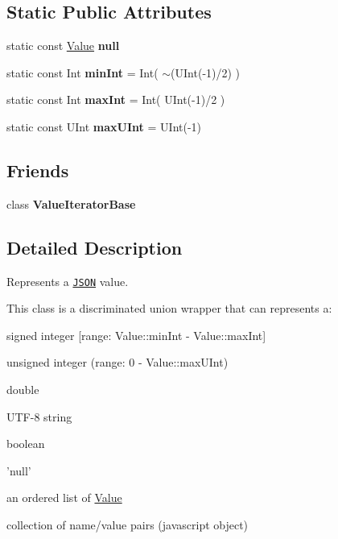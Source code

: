 \subsection*{Static Public Attributes}
\begin{DoxyCompactItemize}
\item 
\hypertarget{class_json_1_1_value_ae5c01c1a10d1e9fb731aae53e8234e24}{static const \hyperlink{class_json_1_1_value}{Value} {\bfseries null}}\label{class_json_1_1_value_ae5c01c1a10d1e9fb731aae53e8234e24}

\item 
\hypertarget{class_json_1_1_value_a2d95300265aecf56a1f051203656bd18}{static const Int {\bfseries min\+Int} = Int( $\sim$(U\+Int(-\/1)/2) )}\label{class_json_1_1_value_a2d95300265aecf56a1f051203656bd18}

\item 
\hypertarget{class_json_1_1_value_a8d0822b65b23b9cec6626195cf5343af}{static const Int {\bfseries max\+Int} = Int( U\+Int(-\/1)/2 )}\label{class_json_1_1_value_a8d0822b65b23b9cec6626195cf5343af}

\item 
\hypertarget{class_json_1_1_value_ae881a8e48d8e6d6ba87ede37e279f051}{static const U\+Int {\bfseries max\+U\+Int} = U\+Int(-\/1)}\label{class_json_1_1_value_ae881a8e48d8e6d6ba87ede37e279f051}

\end{DoxyCompactItemize}
\subsection*{Friends}
\begin{DoxyCompactItemize}
\item 
\hypertarget{class_json_1_1_value_ad016df56489e5d360735457afba2f649}{class {\bfseries Value\+Iterator\+Base}}\label{class_json_1_1_value_ad016df56489e5d360735457afba2f649}

\end{DoxyCompactItemize}


\subsection{Detailed Description}
Represents a \href{http://www.json.org}{\tt J\+S\+O\+N} value. 

This class is a discriminated union wrapper that can represents a\+:
\begin{DoxyItemize}
\item signed integer \mbox{[}range\+: Value\+::min\+Int -\/ Value\+::max\+Int\mbox{]}
\item unsigned integer (range\+: 0 -\/ Value\+::max\+U\+Int)
\item double
\item U\+T\+F-\/8 string
\item boolean
\item 'null'
\item an ordered list of \hyperlink{class_json_1_1_value}{Value}
\item collection of name/value pairs (javascript object)
\end{DoxyItemize}

